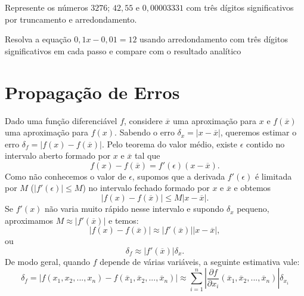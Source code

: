\begin{prob}  Represente os números $3276$; $42,55$ e $0,00003331$ com três dígitos significativos por truncamento e arredondamento.
\end{prob}

\begin{prob} Resolva a equação $0,1x-0,01=12$ usando arredondamento com três dígitos significativos em cada passo e compare com o resultado analítico
\end{prob}



\section{Propagação de Erros}

Dado uma função diferenciável $f$, considere $\overline{x}$ uma aproximação para $x$ e $f(\overline{x})$ uma aproximação para $f(x)$. Sabendo o erro $\delta_x=|x-\overline{x}|$, queremos estimar o erro $\delta_f=|f(x)-f(\overline{x})|$. Pelo teorema do valor médio, existe $\epsilon$ contido no intervalo aberto formado por $x$ e $\overline{x}$ tal que
$$
f(x)-f(\overline{x})=f'(\epsilon)(x-\overline{x}).
$$
Como não conhecemos o valor de $\epsilon$, supomos que a derivada $f'(\epsilon)$ é limitada por $M$ ($|f'(\epsilon)|\leq M$) no intervalo fechado formado por $x$ e $\overline{x}$ e obtemos
$$
|f(x)-f(\overline{x})|\leq M|x-\overline{x}|.
$$
Se $f'(x)$ não varia muito rápido nesse intervalo e supondo $\delta_x$ pequeno, aproximamos $M\approx |f'(\overline{x})|$ e temos:
$$
|f(x)-f(\overline{x})|\approx |f'(\overline{x})||x-\overline{x}|,
$$
ou
$$
\delta_f\approx |f'(\overline{x})|\delta_x.
$$
De modo geral, quando $f$ depende de várias variáveis, a seguinte estimativa vale:
$$
\delta_f=|f(x_1,x_2,...,x_n)-f(\overline{x}_1, \overline{x}_2,...,\overline{x}_n)|\approx \sum_{i=1}^n\left|\frac{\partial f}{\partial x_i}(\overline{x}_1, \overline{x}_2,...,\overline{x}_n)\right|\delta_{x_i}
$$
